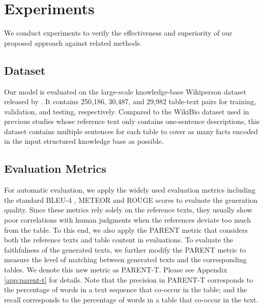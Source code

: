 \documentclass[11pt,a4paper]{article}
\begin{document}
\section{Experiments}
We conduct experiments to verify the effectiveness and superiority of our proposed approach against related methods.

\subsection{Dataset}

Our model is evaluated on the large-scale knowledge-base Wikiperson dataset released by \citet{Wang2018}. It contains 250,186, 30,487, and 29,982 table-text pairs for training, validation, and testing, respectively. 
Compared to the WikiBio dataset used in previous studies \cite{Wikiemnlp2016,structure2018,Wiseman2018,Ma2019} whose reference text only contains one-sentence descriptions, this
dataset contains multiple sentences for each table to cover as many facts encoded in the input structured knowledge base as possible.


\subsection{Evaluation Metrics}

For automatic evaluation, we apply the widely used evaluation metrics including the standard BLEU-4 \cite{Papineni2002}, METEOR \cite{Denkowski2014} and ROUGE \cite{Lin2004} scores to evaluate the generation quality. 
Since these metrics rely solely on the reference texts, they usually show poor correlations with human judgments when the references deviate too much from the table. 
To this end, we also apply the PARENT \cite{Dhingra2019} metric that considers both the reference texts and table content in evaluations. 
To evaluate the faithfulness of the generated texts, we further modify the PARENT metric to measure the level of matching between generated texts and the corresponding tables. We denote this new metric as PARENT-T. Please see Appendix \ref{app:parent-t} for details. Note that the precision in PARENT-T corresponds to the percentage of words in a text sequence that co-occur in the table; and the recall corresponds to the percentage of words in a table that co-occur in the text. 
\end{document}
